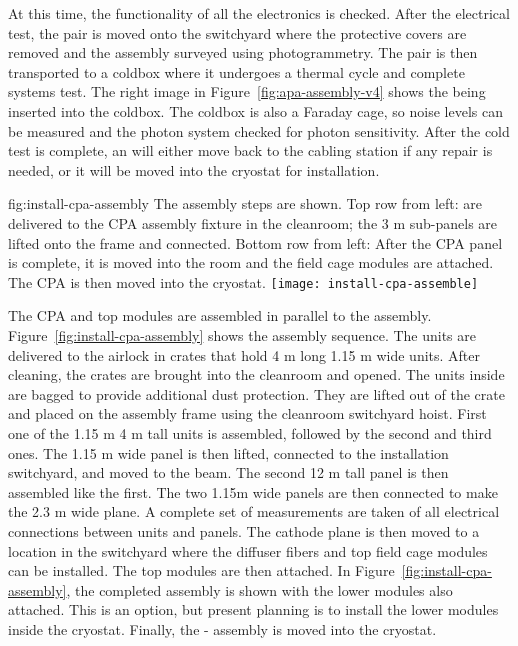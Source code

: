 At this time, the functionality of all the electronics is checked. 
After the  electrical test, the  pair is moved onto the switchyard where the protective covers are removed and the assembly surveyed using photogrammetry. 
The  pair is then transported to a coldbox where it undergoes a thermal cycle and complete systems test. 
The right image in Figure~\ref{fig:apa-assembly-v4} shows the  being inserted into the coldbox. The coldbox is also a Faraday cage, so noise levels can be measured and the photon system checked for photon sensitivity. 
After the cold test is complete, an  will either move back to the cabling station if any repair is needed, or it will be moved into the cryostat for installation. 


\begin{dunefigure}{fig:install-cpa-assembly}
  {The  assembly steps are shown. Top row from left:   are delivered to the CPA assembly fixture in the cleanroom; the 3 \si{m} sub-panels are lifted onto the frame and connected. Bottom row from left: After the CPA panel is complete, it is moved into the room and the field cage modules are attached. The CPA is then moved into the cryostat.}
\texttt{[image: install-cpa-assemble]}
\end{dunefigure}

The CPA and top  modules are assembled in parallel to the  assembly. Figure~\ref{fig:install-cpa-assembly} shows the  assembly sequence. The  units are delivered to the airlock in crates that hold 4 \si{m} long 1.15 \si{m} wide units. After cleaning, the crates are brought into the cleanroom and opened. The  units inside are bagged to provide additional dust protection. They are lifted out of the crate and placed on the assembly frame using the cleanroom switchyard hoist. First one of the 1.15 \si{m} 4 
\si{m} tall units is assembled, followed by the second and third ones. The 1.15 \si{m} wide  panel is then lifted, connected to the installation switchyard, and moved to the  beam. The second 12 \si{m} tall panel is then assembled like the first. The two 1.15m wide panels are then connected to make the 2.3 \si{m} wide plane.  A complete set of  measurements are taken of all electrical connections between units and panels.  The cathode plane  is then moved to a location in the switchyard where the diffuser fibers and top field cage modules can be installed.
 The top  modules are then attached. In Figure~\ref{fig:install-cpa-assembly}, the completed assembly is shown with the lower  modules also attached. This is an option, but present planning is to install the lower  modules  inside the cryostat. Finally, the - assembly is moved into the cryostat.


